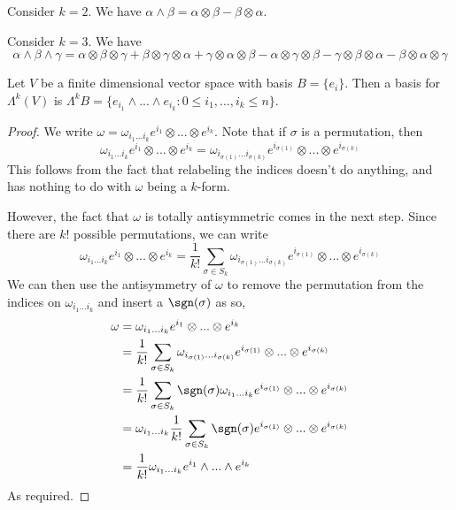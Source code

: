 \begin{example}
Consider $k=2$. We have $\alpha\wedge \beta =\alpha\otimes \beta - \beta \otimes \alpha$. 
\end{example}
\begin{example}
Consider $k=3$. We have 
\[\alpha\wedge\beta\wedge\gamma = \alpha\otimes\beta\otimes\gamma + \beta\otimes\gamma\otimes\alpha + \gamma\otimes\alpha\otimes\beta - \alpha\otimes\gamma\otimes\beta - \gamma\otimes\beta\otimes\alpha - \beta\otimes\alpha\otimes\gamma\]
\end{example}
\begin{lemma}
    Let $V$ be a finite dimensional vector space with basis $B = \{e_i\}$. Then a basis for $\Lambda^k(V)$ is $\Lambda^k B = \{e_{i_1}\wedge...\wedge e_{i_k}:0\leq i_1,...,i_k\leq n\}$.
\end{lemma}
\begin{proof}
We write $\omega = \omega_{i_1...i_k} e^{i_1}\otimes ...\otimes e^{i_k}$. Note that if $\sigma$ is a permutation, then
\[\omega_{i_1...i_k} e^{i_1}\otimes ...\otimes e^{i_k}=\omega_{i_{\sigma(1)}...i_{\sigma(k)}} e^{i_{\sigma(1)}}\otimes ...\otimes e^{i_{\sigma(k)}}\]
This follows from the fact that relabeling the indices doesn't do anything, and has nothing to do with $\omega$ being a $k$-form.

However, the fact that $\omega$ is totally antisymmetric comes in the next step. Since there are $k!$ possible permutations, we can write 
\[\omega_{i_1...i_k} e^{i_1}\otimes ...\otimes e^{i_k}=\frac{1}{k!}\sum_{\sigma\in S_k}\omega_{i_{\sigma(1)}...i_{\sigma(k)}} e^{i_{\sigma(1)}}\otimes ...\otimes e^{i_{\sigma(k)}}\]
We can then use the antisymmetry of $\omega$ to remove the permutation from the indices on $\omega_{i_1...i_k}$ and insert a $\sgn(\sigma)$ as so,
\begin{align*}
    \omega &= \omega_{i_1...i_k} e^{i_1}\otimes ...\otimes e^{i_k}\\
    &= \frac{1}{k!}\sum_{\sigma\in S_k}\omega_{i_{\sigma(1)}...i_{\sigma(k)}} e^{i_{\sigma(1)}}\otimes ...\otimes e^{i_{\sigma(k)}}\\
    &= \frac{1}{k!}\sum_{\sigma\in S_k}\sgn(\sigma)\omega_{i_1...i_k} e^{i_{\sigma(1)}}\otimes ...\otimes e^{i_{\sigma(k)}}\\
    &= \omega_{i_1...i_k}\frac{1}{k!}\sum_{\sigma\in S_k}\sgn(\sigma) e^{i_{\sigma(1)}}\otimes ...\otimes e^{i_{\sigma(k)}}\\
    &= \frac{1}{k!}\omega_{i_1...i_k} e^{i_1}\wedge...\wedge e^{i_k}
\end{align*}
As required.
\end{proof}
